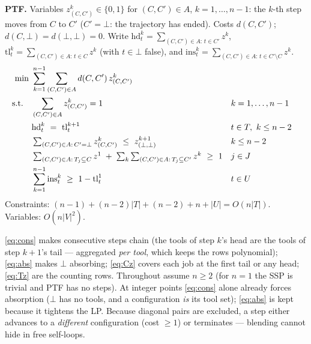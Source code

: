 \documentclass[11pt,a4paper]{article}
\theoremstyle{plain}
\theoremstyle{definition}
\begin{document}
\begin{formbox}
\textbf{PTF.} Variables $z^k_{(C,C')}\in\{0,1\}$ for $(C,C')\in A$, $k=1,\dots,n-1$:
the $k$-th step moves from $C$ to $C'$ ($C'=\bot$: the trajectory has ended).
Costs $d(C,C')$; $d(C,\bot)=d(\bot,\bot)=0$. Write
$\mathrm{hd}_t^k=\sum_{(C,C')\in A:\,t\in C'}z^k$,
$\mathrm{tl}_t^k=\sum_{(C,C')\in A:\,t\in C}z^k$ (with $t\in\bot$ false), and
$\mathrm{ins}_t^k=\sum_{(C,C')\in A:\,t\in C'\setminus C}z^k$.
\begin{align}
  \min\ & \sum_{k=1}^{n-1}\sum_{(C,C')\in A} d(C,C')\,z^k_{(C,C')} \notag\\
  \text{s.t.}\quad
  & \sum_{(C,C')\in A} z^k_{(C,C')} = 1 && k=1,\dots,n-1 \label{eq:Pz}\\
  & \mathrm{hd}_t^k \ =\ \mathrm{tl}_t^{k+1} && t\in T,\ k\le n-2 \label{eq:cons}\\
  & \textstyle\sum_{(C,C')\in A:\,C'=\bot} z^k_{(C,C')} \ \le\ z^{k+1}_{(\bot,\bot)}
    && k\le n-2 \label{eq:abs}\\
  & \textstyle\sum_{(C,C')\in A:\,T_j\subseteq C} z^1
    \;+\;\sum_{k}\sum_{(C,C')\in A:\,T_j\subseteq C'} z^k \ \ge\ 1 && j\in J
    \label{eq:Cz}\\
  & \sum_{k=1}^{n-1}\mathrm{ins}_t^k \ \ge\ 1-\mathrm{tl}_t^1 && t\in U \label{eq:Tz}
\end{align}
Constraints: $(n-1)+(n-2)|T|+(n-2)+n+|U|=O(n|T|)$. Variables: $O(n|V|^2)$.
\end{formbox}

\eqref{eq:cons} makes consecutive steps chain (the tools of step $k$'s head are the
tools of step $k{+}1$'s tail --- aggregated \emph{per tool}, which keeps the rows
polynomial); \eqref{eq:abs} makes $\bot$ absorbing; \eqref{eq:Cz} covers each job at
the first tail or any head; \eqref{eq:Tz} are the counting rows.
Throughout assume $n\ge2$ (for $n=1$ the SSP is trivial and PTF has no steps).
At integer points \eqref{eq:cons} alone already forces absorption ($\bot$ has no
tools, and a configuration \emph{is} its tool set); \eqref{eq:abs} is kept because
it tightens the LP. Because diagonal
pairs are excluded, a step either advances to a \emph{different} configuration
(cost $\ge1$) or terminates --- blending cannot hide in free self-loops.
\end{document}
